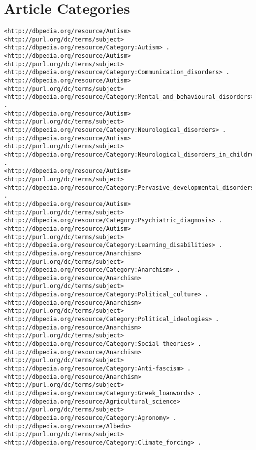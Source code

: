 \section{Article Categories}
\begin{lstlisting}[breaklines, basicstyle=\small]
<http://dbpedia.org/resource/Autism> <http://purl.org/dc/terms/subject> <http://dbpedia.org/resource/Category:Autism> .
<http://dbpedia.org/resource/Autism> <http://purl.org/dc/terms/subject> <http://dbpedia.org/resource/Category:Communication_disorders> .
<http://dbpedia.org/resource/Autism> <http://purl.org/dc/terms/subject> <http://dbpedia.org/resource/Category:Mental_and_behavioural_disorders> .
<http://dbpedia.org/resource/Autism> <http://purl.org/dc/terms/subject> <http://dbpedia.org/resource/Category:Neurological_disorders> .
<http://dbpedia.org/resource/Autism> <http://purl.org/dc/terms/subject> <http://dbpedia.org/resource/Category:Neurological_disorders_in_children> .
<http://dbpedia.org/resource/Autism> <http://purl.org/dc/terms/subject> <http://dbpedia.org/resource/Category:Pervasive_developmental_disorders> .
<http://dbpedia.org/resource/Autism> <http://purl.org/dc/terms/subject> <http://dbpedia.org/resource/Category:Psychiatric_diagnosis> .
<http://dbpedia.org/resource/Autism> <http://purl.org/dc/terms/subject> <http://dbpedia.org/resource/Category:Learning_disabilities> .
<http://dbpedia.org/resource/Anarchism> <http://purl.org/dc/terms/subject> <http://dbpedia.org/resource/Category:Anarchism> .
<http://dbpedia.org/resource/Anarchism> <http://purl.org/dc/terms/subject> <http://dbpedia.org/resource/Category:Political_culture> .
<http://dbpedia.org/resource/Anarchism> <http://purl.org/dc/terms/subject> <http://dbpedia.org/resource/Category:Political_ideologies> .
<http://dbpedia.org/resource/Anarchism> <http://purl.org/dc/terms/subject> <http://dbpedia.org/resource/Category:Social_theories> .
<http://dbpedia.org/resource/Anarchism> <http://purl.org/dc/terms/subject> <http://dbpedia.org/resource/Category:Anti-fascism> .
<http://dbpedia.org/resource/Anarchism> <http://purl.org/dc/terms/subject> <http://dbpedia.org/resource/Category:Greek_loanwords> .
<http://dbpedia.org/resource/Agricultural_science> <http://purl.org/dc/terms/subject> <http://dbpedia.org/resource/Category:Agronomy> .
<http://dbpedia.org/resource/Albedo> <http://purl.org/dc/terms/subject> <http://dbpedia.org/resource/Category:Climate_forcing> .
\end{lstlisting}

